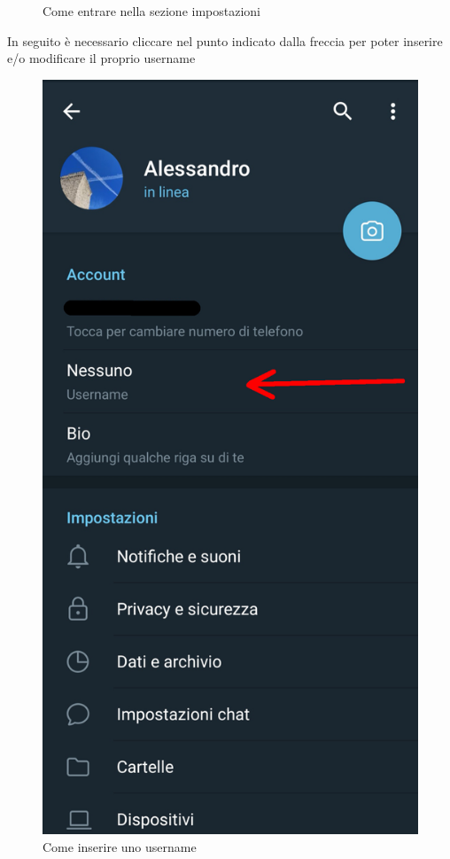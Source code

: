 \begin{figure}[H]
		\caption{Come entrare nella sezione impostazioni}
		\label{Screenshot1}
	\end{figure}
	\newpage
	In seguito è necessario cliccare nel punto indicato dalla freccia per poter inserire e/o modificare il proprio username
	\begin{figure}[H]
		\centering
		\includegraphics[scale=0.100]{res/images/telegram2.jpg}
		\caption{Come inserire uno username}
		\label{Screenshot2}
	\end{figure}
